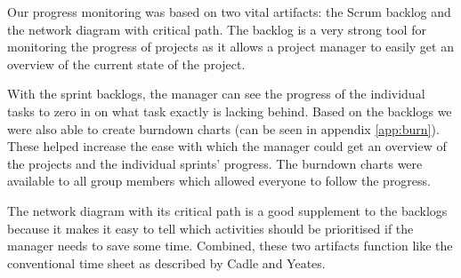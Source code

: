 Our progress monitoring was based on two vital artifacts: the Scrum backlog and the network
diagram with critical path. The backlog is a very strong tool for monitoring the progress
of projects as it allows a project manager to easily get an overview of the current state
of the project.

With the sprint backlogs, the manager can see the progress of the individual tasks to zero 
in on what task exactly is lacking behind. Based on the backlogs we were also able to create 
burndown charts (can be seen in appendix \ref{app:burn}). These helped increase the ease 
with which the manager could get an overview of the projects and the individual sprints' progress. 
The burndown charts were available to all group members which allowed everyone to follow the progress.

The network diagram with its critical path is a good supplement to the backlogs because it
makes it easy to tell which activities should be prioritised if the manager needs to save
some time. Combined, these two artifacts function like the conventional time sheet as
described by Cadle and Yeates\cite[ch.~11]{caye}.
